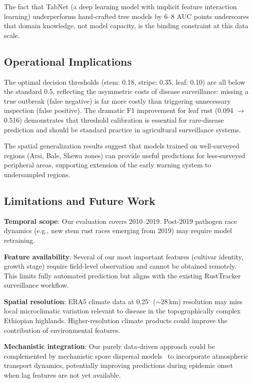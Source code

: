 \documentclass[10pt,twocolumn,letterpaper]{article}
\begin{document}
The fact that TabNet (a deep learning model with implicit feature interaction learning) underperforms hand-crafted tree models by 6--8 AUC points underscores that domain knowledge, not model capacity, is the binding constraint at this data scale.

\subsection{Operational Implications}

The optimal decision thresholds (stem: 0.18, stripe: 0.35, leaf: 0.10) are all below the standard 0.5, reflecting the asymmetric costs of disease surveillance: missing a true outbreak (false negative) is far more costly than triggering unnecessary inspection (false positive). The dramatic F1 improvement for leaf rust (0.094 $\rightarrow$ 0.516) demonstrates that threshold calibration is essential for rare-disease prediction and should be standard practice in agricultural surveillance systems.

The spatial generalization results suggest that models trained on well-surveyed regions (Arsi, Bale, Shewa zones) can provide useful predictions for less-surveyed peripheral areas, supporting extension of the early warning system to undersampled regions.

\subsection{Limitations and Future Work}

\textbf{Temporal scope}: Our evaluation covers 2010--2019. Post-2019 pathogen race dynamics (e.g., new stem rust races emerging from 2019) may require model retraining.

\textbf{Feature availability}: Several of our most important features (cultivar identity, growth stage) require field-level observation and cannot be obtained remotely. This limits fully automated prediction but aligns with the existing RustTracker surveillance workflow.

\textbf{Spatial resolution}: ERA5 climate data at 0.25$^\circ$ (${\sim}$28\,km) resolution may miss local microclimatic variation relevant to disease in the topographically complex Ethiopian highlands. Higher-resolution climate products could improve the contribution of environmental features.

\textbf{Mechanistic integration}: Our purely data-driven approach could be complemented by mechanistic spore dispersal models~\cite{meyer2021} to incorporate atmospheric transport dynamics, potentially improving predictions during epidemic onset when lag features are not yet available.
\end{document}
